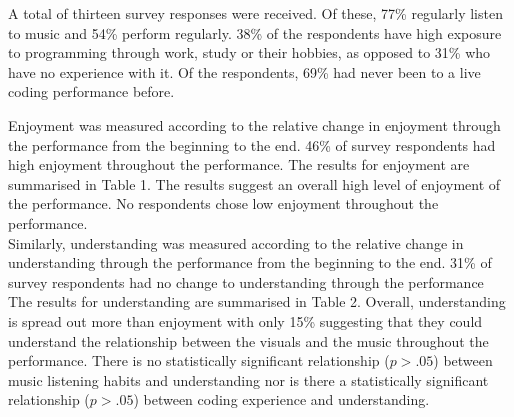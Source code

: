 A total of thirteen survey responses were received. Of these, 77\% regularly listen to music and 54\% perform regularly. 38\% of the respondents have high exposure to programming through work, study or their hobbies, as opposed to 31\% who have no experience with it. Of the respondents, 69\% had never been to a live coding performance before.

Enjoyment was measured according to the relative change in enjoyment through the performance from the beginning to the end. 46\% of survey respondents had high enjoyment throughout the performance. The results for enjoyment are summarised in Table 1. The results suggest an overall high level of enjoyment of the performance. No respondents chose  low enjoyment throughout the performance.\\


Similarly, understanding was measured according to the relative change in understanding through the performance from the beginning to the end. 31\% of survey respondents had no change to understanding through the performance   The results for understanding are summarised in Table 2. Overall, understanding is spread out more than enjoyment with only 15\% suggesting that they could understand the relationship between the visuals and the music throughout the performance. There is no statistically significant relationship ($p > .05$) between music listening habits and understanding nor is there a statistically significant relationship ($p > .05$) between coding experience and understanding.\\


